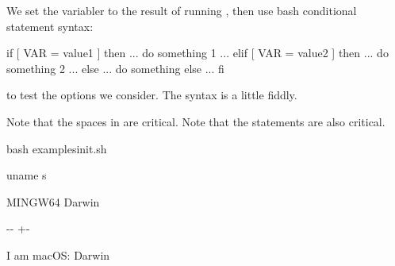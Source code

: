 \documentclass[letterpaper,10pt,english]{sphinxmanual}
\newlength\nbsphinxcodecellspacing
\begin{document}
We set the variabler  to the result of running , then use bash conditional statement syntax:

\begin{sphinxVerbatim}[commandchars=\\\{\}]
if [ \PYGZdl{}VAR = value1 ]
then
  ... do something 1 ...
elif [ \PYGZdl{}VAR = value2 ]
then
  ... do something 2 ...
else
  ... do something else ...
fi
\end{sphinxVerbatim}

to test the options we consider. The syntax is a little fiddly.

Note that the spaces in  are critical. Note that the  statements are also critical.

{
\begin{sphinxVerbatim}[commandchars=\\\{\}]
\llap{\color{nbsphinxin}[19]:\,\hspace{\fboxrule}\hspace{\fboxsep}}\PYGZpc{}\PYGZpc{}bash
 examples\PYGZus{}init.sh

uname \PYGZhy{}s

 \PYG{o}{[}   MINGW64 \PYG{o}{]}
   
 \PYG{o}{[}   Darwin \PYG{o}{]}
   
   
\end{sphinxVerbatim}
}

{

\kern-\sphinxverbatimsmallskipamount\kern-\baselineskip
\kern+\FrameHeightAdjust\kern-\fboxrule
\vspace{\nbsphinxcodecellspacing}

\begin{sphinxVerbatim}[commandchars=\\\{\}]
I am macOS: Darwin
\end{sphinxVerbatim}
}
\end{document}
